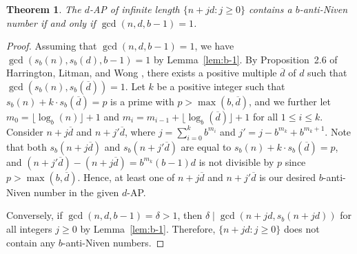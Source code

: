 \documentclass[12pt]{article}
\newtheorem{theorem}{Theorem}[section]
\theoremstyle{definition}
\begin{document}
\begin{theorem}
The $d$-AP of infinite length $\{n+jd:j\geq0\}$ contains a $b$-anti-Niven number if and only if $\gcd(n,d,b-1)=1$.
\end{theorem}
\begin{proof}
Assuming that $\gcd(n,d,b-1)=1$, we have $\gcd(s_b(n),s_b(d),b-1)=1$ by Lemma~\ref{lem:b-1}. By Proposition~2.6 of Harrington, Litman, and Wong \cite{hlw}, there exists a positive multiple $\overline{d}$ of $d$ such that $\gcd(s_b(n),s_b(\overline{d}))=1$. Let $k$ be a positive integer such that $s_b(n)+k\cdot s_b(\overline{d})=p$ is a prime with $p>\max(b,\overline{d})$, and we further let $m_0=\lfloor\log_b(n)\rfloor+1$ and $m_i=m_{i-1}+\lfloor\log_b(\overline{d})\rfloor+1$ for all $1\leq i\leq k$. Consider $n+j\overline{d}$ and $n+j'\overline{d}$, where $j=\sum_{i=0}^kb^{m_i}$ and $j'=j-b^{m_k}+b^{m_k+1}$. Note that both $s_b(n+j\overline{d})$ and $s_b(n+j'\overline{d})$ are equal to $s_b(n)+k\cdot s_b(\overline{d})=p$, and $(n+j'\overline{d})-(n+j\overline{d})=b^{m_k}(b-1)d$ is not divisible by $p$ since $p>\max(b,\overline{d})$. Hence, at least one of $n+j\overline{d}$ and $n+j'\overline{d}$ is our desired $b$-anti-Niven number in the given $d$-AP.


Conversely, if $\gcd(n,d,b-1)=\delta>1$, then $\delta\mid\gcd(n+jd,s_b(n+jd))$ for all integers $j\geq0$ by Lemma~\ref{lem:b-1}. Therefore, $\{n+jd:j\geq0\}$ does not contain any $b$-anti-Niven numbers.
%
\end{proof}
\end{document}
